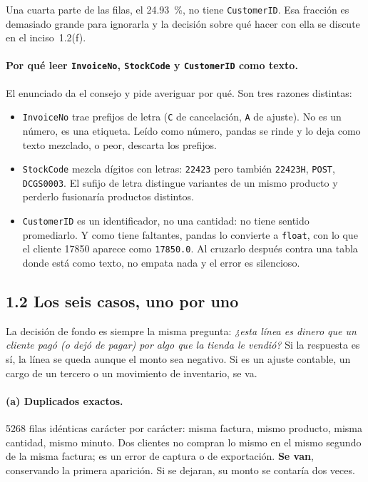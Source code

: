 \documentclass[11pt]{article}
\begin{document}


Una cuarta parte de las filas, el \SI{24.93}{\percent}, no tiene
\texttt{CustomerID}. Esa fracci\'on es demasiado grande para ignorarla y la
decisi\'on sobre qu\'e hacer con ella se discute en el inciso~1.2(f).

\paragraph{Por qu\'e leer \texttt{InvoiceNo}, \texttt{StockCode} y
\texttt{CustomerID} como texto.} El enunciado da el consejo y pide
averiguar por qu\'e. Son tres razones distintas:
\begin{itemize}[nosep,leftmargin=1.4em]
  \item \texttt{InvoiceNo} trae prefijos de letra (\texttt{C} de
  cancelaci\'on, \texttt{A} de ajuste). No es un n\'umero, es una etiqueta.
  Le\'ido como n\'umero, pandas se rinde y lo deja como texto mezclado, o
  peor, descarta los prefijos.
  \item \texttt{StockCode} mezcla d\'igitos con letras: \texttt{22423} pero
  tambi\'en \texttt{22423H}, \texttt{POST}, \texttt{DCGS0003}. El sufijo de
  letra distingue variantes de un mismo producto y perderlo fusionar\'ia
  productos distintos.
  \item \texttt{CustomerID} es un identificador, no una cantidad: no tiene
  sentido promediarlo. Y como tiene faltantes, pandas lo convierte a
  \texttt{float}, con lo que el cliente \num{17850} aparece como
  \texttt{17850.0}. Al cruzarlo despu\'es contra una tabla donde est\'a como
  texto, no empata nada y el error es silencioso.
\end{itemize}

\subsection{1.2 Los seis casos, uno por uno}



La decisi\'on de fondo es siempre la misma pregunta: \emph{¿esta l\'inea es
dinero que un cliente pag\'o (o dej\'o de pagar) por algo que la tienda le
vendi\'o?} Si la respuesta es s\'i, la l\'inea se queda aunque el monto sea
negativo. Si es un ajuste contable, un cargo de un tercero o un movimiento de
inventario, se va.

\paragraph{(a) Duplicados exactos.} \num{5268} filas id\'enticas car\'acter
por car\'acter: misma factura, mismo producto, misma cantidad, mismo minuto.
Dos clientes no compran lo mismo en el mismo segundo de la misma factura; es
un error de captura o de exportaci\'on. \textbf{Se van}, conservando la
primera aparici\'on. Si se dejaran, su monto se contar\'ia dos veces.
\end{document}
